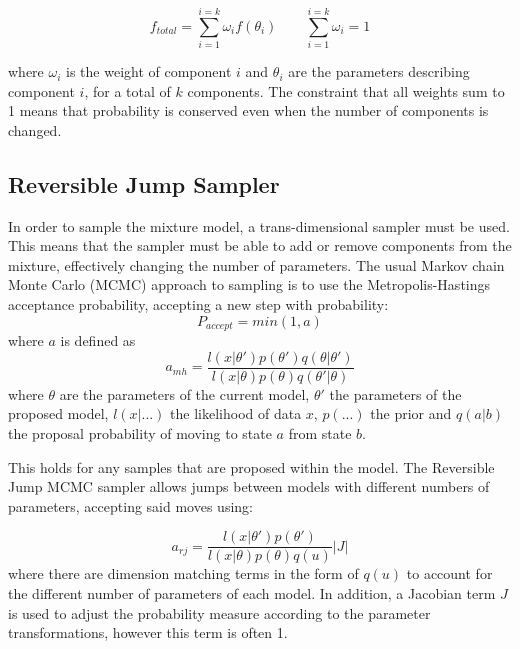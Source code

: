 \documentclass[11pt]{article} %
\begin{document}
\begin{equation}\label{eq:mm}
f_{total} = \sum_{i=1}^{i=k}\omega_{i}f(\theta_{i}) \qquad \sum_{i=1}^{i=k}\omega_{i} = 1
\end{equation}

where $\omega_{i}$ is the weight of component $i$ and $\theta_{i}$ are the parameters describing component $i$, for a total of $k$ components. The constraint that all weights sum to 1 means that probability is conserved even when the number of components is changed.

\subsection{Reversible Jump Sampler}\label{rjsampler}
In order to sample the mixture model, a trans-dimensional sampler must be used. This means that the sampler must be able to add or remove components from the mixture, effectively changing the number of parameters. 
The usual Markov chain Monte Carlo (MCMC) approach to sampling is to use the Metropolis-Hastings acceptance probability, accepting a new step with probability:
\begin{equation}\label{eq:ap}
P_{accept} = min(1,a)
\end{equation}
where $a$ is defined as
\begin{equation}\label{eq:mh}
a_{mh} = \frac{l(x|\theta')p(\theta')q(\theta|\theta')}{ l(x|\theta)p(\theta)q(\theta'|\theta)}
\end{equation}
where $\theta$ are the parameters of the current model, $\theta'$ the parameters of the proposed model, $l(x|...)$ the likelihood of data $x$, $p(...)$ the prior and $q(a|b)$ the proposal probability of moving to state $a$ from state $b$.

This holds for any samples that are proposed within the model. The Reversible Jump MCMC sampler allows jumps between models with different numbers of parameters, accepting said moves using:

\begin{equation}\label{eq:rj_a}
a_{rj} = \frac{l(x|\theta')p(\theta')}{l(x|\theta)p(\theta)q(u)}|J|
\end{equation}
where there are dimension matching terms in the form of $q(u)$ to account for the different number of parameters of each model. In addition, a Jacobian term $J$ is used to adjust the probability measure according to the parameter transformations, however this term is often 1.
\end{document}
